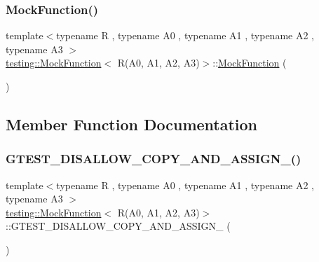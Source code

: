 \subsubsection{\texorpdfstring{MockFunction()}{MockFunction()}}
{\footnotesize\ttfamily template$<$typename R , typename A0 , typename A1 , typename A2 , typename A3 $>$ \\
\mbox{\hyperlink{classtesting_1_1_mock_function}{testing\+::\+Mock\+Function}}$<$ R(A0, A1, A2, A3)$>$\+::\mbox{\hyperlink{classtesting_1_1_mock_function}{Mock\+Function}} (\begin{DoxyParamCaption}{ }\end{DoxyParamCaption})\hspace{0.3cm}{\ttfamily [inline]}}



\subsection{Member Function Documentation}
\mbox{\label{classtesting_1_1_mock_function_3_01_r_07_a0_00_01_a1_00_01_a2_00_01_a3_08_4_acf683aa1f865a8e7539d02bfb8fa5ff8}} 
\subsubsection{\texorpdfstring{GTEST\_DISALLOW\_COPY\_AND\_ASSIGN\_()}{GTEST\_DISALLOW\_COPY\_AND\_ASSIGN\_()}}
{\footnotesize\ttfamily template$<$typename R , typename A0 , typename A1 , typename A2 , typename A3 $>$ \\
\mbox{\hyperlink{classtesting_1_1_mock_function}{testing\+::\+Mock\+Function}}$<$ R(A0, A1, A2, A3)$>$\+::G\+T\+E\+S\+T\+\_\+\+D\+I\+S\+A\+L\+L\+O\+W\+\_\+\+C\+O\+P\+Y\+\_\+\+A\+N\+D\+\_\+\+A\+S\+S\+I\+G\+N\+\_\+ (\begin{DoxyParamCaption}\item[{\mbox{\hyperlink{classtesting_1_1_mock_function}{Mock\+Function}}$<$ R(A0, A1, A2, A3)$>$}]{ }\end{DoxyParamCaption})\hspace{0.3cm}{\ttfamily [private]}}

